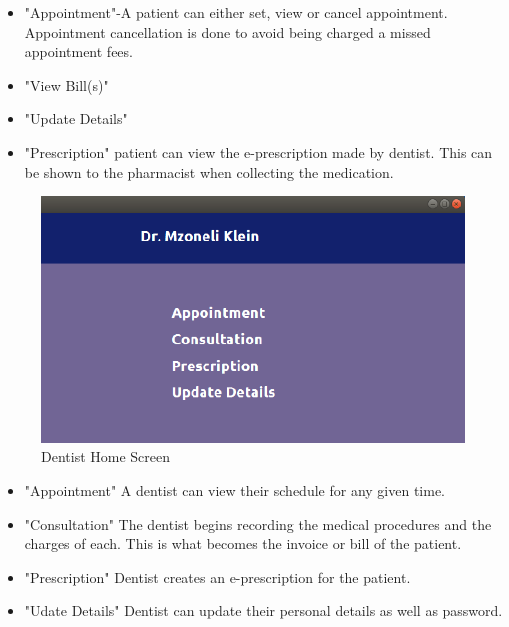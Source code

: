 \documentclass[11 pt]{article}
\begin{document}
    \begin{itemize}
    \item
    "Appointment"-A patient can either set, view or cancel appointment. Appointment cancellation is done to avoid being charged a missed appointment fees.    
\item
"View Bill(s)"
\item 
"Update Details"
\item
"Prescription" patient can view the e-prescription made by dentist. This can be shown to the pharmacist when collecting the medication. 
    \clearpage
    \end{itemize}
    \begin{figure}[h]
    \centering
    \includegraphics[width=.7\linewidth]{dr_home.png}
    \caption{Dentist Home Screen}
    \label{fig:ERD}
    \end{figure}
    \begin{itemize}
     \item
    "Appointment" A dentist can view their schedule for any given time.
\item
"Consultation" The dentist begins recording the medical procedures and the charges of each. This is what becomes the invoice or bill of the patient.
\item 
"Prescription" Dentist creates an e-prescription for the patient.
\item
"Udate Details" Dentist can update their personal details as well as password.
    \end{itemize}
    \clearpage
\end{document}
